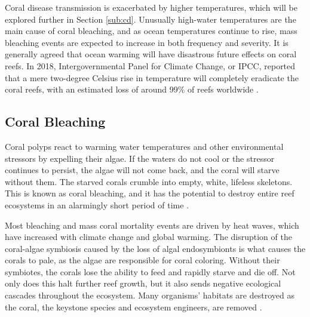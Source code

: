 \documentclass{book}\usepackage{knitr}
\begin{document}
Coral disease transmission is exacerbated by higher temperatures, which will be explored further in Section \ref{sub:cd}. Unusually high-water temperatures are the main cause of coral bleaching, and as ocean temperatures continue to rise, mass bleaching events are expected to increase in both frequency and severity\citep{Keller2009ClimateCC}. It is generally agreed that ocean warming will have disastrous future effects on coral reefs.  In 2018, Intergovernmental Panel for Climate Change, or IPCC, reported that a mere two-degree Celsius rise in temperature will completely eradicate the coral reefs, with an estimated loss of around 99\% of reefs worldwide \citep{wwfindex}. 

\subsection{Coral Bleaching}

Coral polyps react to warming water temperatures and other environmental stressors by expelling their algae. If the waters do not cool or the stressor continues to persist, the algae will not come back, and the coral will starve without them. The starved corals crumble into empty, white, lifeless skeletons. This is known as coral bleaching, and it has the potential to destroy entire reef ecosystems in an alarmingly short period of time \citep{https://doi.org/10.1111/gcb.14871}. 

Most bleaching and mass coral mortality events are driven by heat waves, which have increased with climate change and global warming. The disruption of the coral-algae symbiosis caused by the loss of algal endosymbionts is what causes the corals to pale, as the algae are responsible for coral coloring. Without their symbiotes, the corals lose the ability to feed and rapidly starve and die off. Not only does this halt further reef growth, but it also sends negative ecological cascades throughout the ecosystem. Many organisms' habitats are destroyed as the coral, the keystone species and ecosystem engineers, are removed \citep{https://doi.org/10.1111/gcb.14871}.
\end{document}
